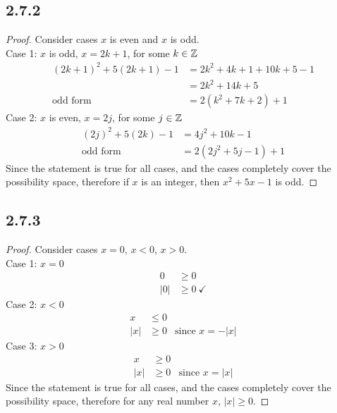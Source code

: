 \subsection*{2.7.2}
\begin{enumerate}
  \begin{proof}
    Consider cases $x$ is even and $x$ is odd. \\
    Case 1: $x$ is odd, $x = 2k+1$, for some $k \in \mathbb{Z}$
    \begin{align*}
      (2k+1)^2 + 5(2k+1) - 1 & = 2k^2 + 4k + 1 + 10k + 5 - 1 \\
                             & = 2k^2 + 14k + 5              \\
      \text{odd form}        & = 2(k^2 + 7k + 2) + 1
    \end{align*}
    Case 2: $x$ is even, $x = 2j$, for some $j \in \mathbb{Z}$
    \begin{align*}
      (2j)^2 + 5(2k) - 1 & = 4j^2 + 10k - 1       \\
      \text{odd form}    & = 2(2j^2 + 5j - 1) + 1
    \end{align*}
    Since the statement is true for all cases, and the cases completely cover the possibility space, therefore if $x$ is an integer, then $x^2 + 5x - 1$ is odd.
  \end{proof}
\end{enumerate}

\subsection*{2.7.3}
\begin{enumerate}
  \begin{proof}
    Consider cases $x = 0$, $x < 0$, $x > 0$. \\
    Case 1: $x = 0$
    \begin{align*}
      0                          & \geq 0            \\
      \left\lvert 0 \right\rvert & \geq 0~\checkmark
    \end{align*}
    Case 2: $x < 0$
    \begin{align*}
      x                          & \leq 0                                                  \\
      \left\lvert x \right\rvert & \geq 0 & \text{since $x = -\left\lvert x \right\rvert$}
    \end{align*}
    Case 3: $x > 0$
    \begin{align*}
      x                          & \geq 0                                                 \\
      \left\lvert x \right\rvert & \geq 0 & \text{since $x = \left\lvert x \right\rvert$}
    \end{align*}
    Since the statement is true for all cases, and the cases completely cover the possibility space, therefore for any real number $x$, $\left\lvert x \right\rvert \geq 0$.
  \end{proof}
\end{enumerate}

